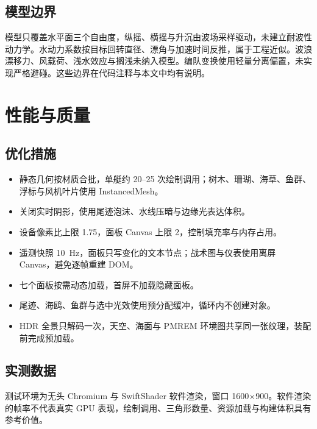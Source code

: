 \documentclass[UTF8, a4paper, 11pt]{ctexart}
\begin{document}
\subsection{模型边界}

模型只覆盖水平面三个自由度，纵摇、横摇与升沉由波场采样驱动，未建立耐波性动力学。水动力系数按目标回转直径、漂角与加速时间反推，属于工程近似。波浪漂移力、风载荷、浅水效应与搁浅未纳入模型。编队变换使用轻量分离偏置，未实现严格避碰。这些边界在代码注释与本文中均有说明。

\section{性能与质量}

\subsection{优化措施}

\begin{itemize}
  \item 静态几何按材质合批，单艇约 20--25 次绘制调用；树木、珊瑚、海草、鱼群、浮标与风机叶片使用 InstancedMesh。
  \item 关闭实时阴影，使用尾迹泡沫、水线压暗与边缘光表达体积。
  \item 设备像素比上限 1.75，面板 Canvas 上限 2，控制填充率与内存占用。
  \item 遥测快照 10~Hz，面板只写变化的文本节点；战术图与仪表使用离屏 Canvas，避免逐帧重建 DOM。
  \item 七个面板按需动态加载，首屏不加载隐藏面板。
  \item 尾迹、海鸥、鱼群与选中光效使用预分配缓冲，循环内不创建对象。
  \item HDR 全景只解码一次，天空、海面与 PMREM 环境图共享同一张纹理，装配前完成预加载。
\end{itemize}

\subsection{实测数据}

测试环境为无头 Chromium 与 SwiftShader 软件渲染，窗口 1600$\times$900。软件渲染的帧率不代表真实 GPU 表现，绘制调用、三角形数量、资源加载与构建体积具有参考价值。
\end{document}
